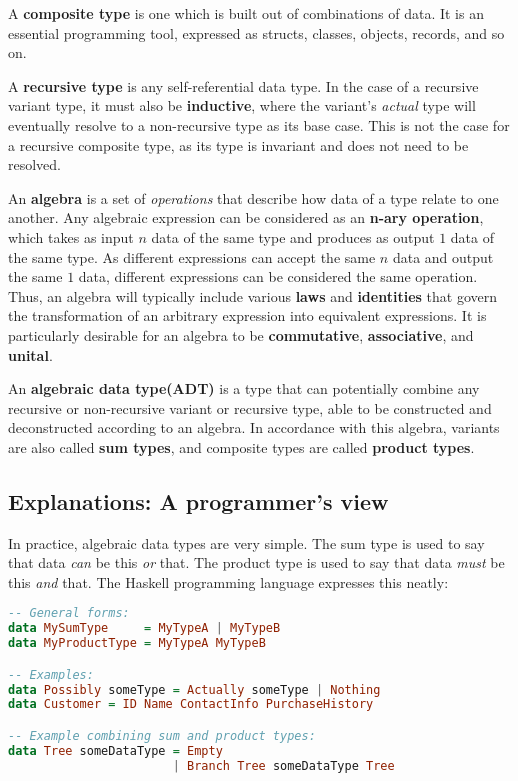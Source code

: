 \documentclass[12pt,a4paper]{article}
\begin{document}
		A \textbf{composite type} is one which is built out of combinations of data. It is an essential programming tool, expressed as structs, classes, objects, records, and so on.
		
		A \textbf{recursive type} is any self-referential data type. In the case of a recursive variant type, it must also be \textbf{inductive}, where the variant's \textit{actual} type will eventually resolve to a non-recursive type as its base case. This is not the case for a recursive composite type, as its type is invariant and does not need to be resolved.
				
		An \textbf{algebra} is a set of \textit{operations} that describe how data of a type relate to one another. Any algebraic expression can be considered as an \textbf{n-ary operation}, which takes as input $n$ data of the same type and produces as output $1$ data of the same type. As different expressions can accept the same $n$ data and output the same $1$ data, different expressions can be considered the same operation. Thus, an algebra will typically include various \textbf{laws} and \textbf{identities} that govern the transformation of an arbitrary expression into equivalent expressions. It is particularly desirable for an algebra to be \textbf{commutative}, \textbf{associative}, and \textbf{unital}.
		
		An \textbf{algebraic data type(ADT)} is a type that can potentially combine any recursive or non-recursive variant or recursive type, able to be constructed and deconstructed according to an algebra. In accordance with this algebra, variants are also called \textbf{sum types}, and composite types are called \textbf{product types}.
		
		\pagebreak
		\subsection{Explanations: A programmer's view}
		
		In practice, algebraic data types are very simple. The sum type is used to say that data \textit{can} be this \textit{or} that. The product type is used to say that data \textit{must} be this \textit{and} that. The Haskell programming language expresses this neatly:
		
		\begin{lstlisting}[language=Haskell]
-- General forms:
data MySumType     = MyTypeA | MyTypeB
data MyProductType = MyTypeA MyTypeB

-- Examples:
data Possibly someType = Actually someType | Nothing
data Customer = ID Name ContactInfo PurchaseHistory

-- Example combining sum and product types:
data Tree someDataType = Empty
                       | Branch Tree someDataType Tree
		\end{lstlisting}
		
\end{document}
